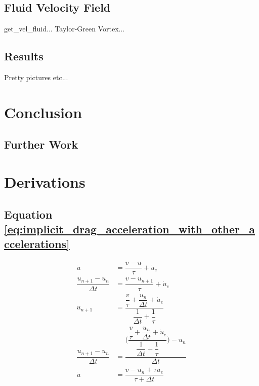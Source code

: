 \documentclass[10pt,a4paper,titlepage]{report}
\begin{document}
\section{Fluid Velocity Field}
get\_vel\_fluid... Taylor-Green Vortex...
\section{Results}
Pretty pictures etc...
\chapter{Conclusion}
\section{Further Work}
\appendix
\chapter{Derivations}
\section{Equation \ref{eq:implicit_drag_acceleration_with_other_accelerations}}
\label{sec:implicit_drag_accel_derivation}
\begin{align}
\dot{u} &= \dfrac{v - u}{\tau} + \dot{u}_{e}
\\\dfrac{u_{n+1} - u_{n}}{\Delta t} &= \dfrac{v - u_{n+1}}{\tau} + \dot{u}_{e}
\\u_{n+1} &= \dfrac{\dfrac{v}{\tau} + \dfrac{u_{n}}{\Delta t} + \dot{u}_{e}}{\dfrac{1}{\Delta t} + \dfrac{1}{\tau}}
\\\dfrac{u_{n+1} - u_{n}}{\Delta t} &= \dfrac{\Bigg(\dfrac{\dfrac{v}{\tau} + \dfrac{u_{n}}{\Delta t} + \dot{u}_{e}}{\dfrac{1}{\Delta t} + \dfrac{1}{\tau}}\Bigg) - u_{n}}{\Delta t}
\\\dot{u} &= \dfrac{v - u_{n} + \tau \dot{u}_{e}}{\tau + \Delta t}
\end{align}


\end{document}
